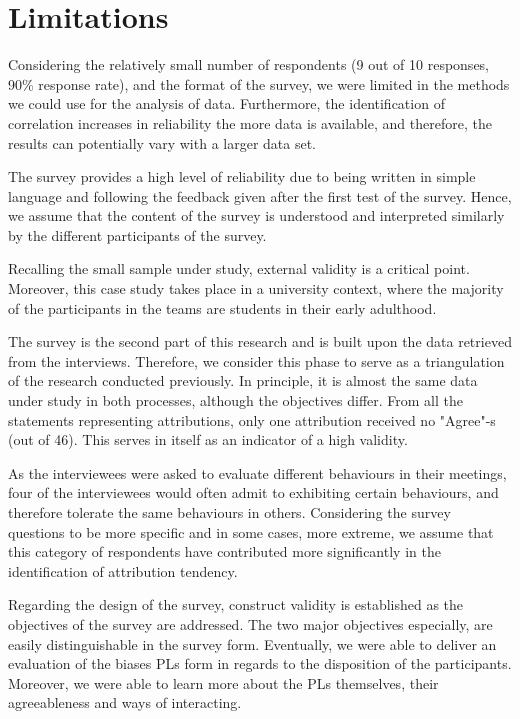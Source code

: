
\section{Limitations} \label{chapt5:Limitations}

Considering the relatively small number of respondents (9 out of 10 responses, 90\% response rate), and the format of the survey, we were limited in the methods we could use for the analysis of data. Furthermore, the identification of correlation increases in reliability the more data is available, and therefore, the results can potentially vary with a larger data set.

The survey provides a high level of reliability due to being written in simple language and following the feedback given after the first test of the survey. Hence, we assume that the content of the survey is understood and interpreted similarly by the different participants of the survey. 

Recalling the small sample under study, external validity is a critical point. Moreover, this case study takes place in a university context, where the majority of the participants in the teams are students in their early adulthood.

The survey is the second part of this research and is built upon the data retrieved from the interviews. Therefore, we consider this phase to serve as a triangulation of the research conducted previously. In principle, it is almost the same data under study in both processes, although the objectives differ. From all the statements representing attributions, only one attribution received no "Agree"-s (out of 46). This serves in itself as an indicator of a high validity.

As the interviewees were asked to evaluate different behaviours in their meetings, four of the interviewees would often admit to exhibiting certain behaviours, and therefore tolerate the same behaviours in others. Considering the survey questions to be more specific and in some cases, more extreme, we assume that this category of respondents have contributed more significantly in the identification of attribution tendency.

Regarding the design of the survey, construct validity is established as the objectives of the survey are addressed. The two major objectives especially, are easily distinguishable in the survey form. Eventually, we were able to deliver an evaluation of the biases PLs form in regards to the disposition of the participants. Moreover, we were able to learn more about the PLs themselves, their agreeableness and ways of interacting.



